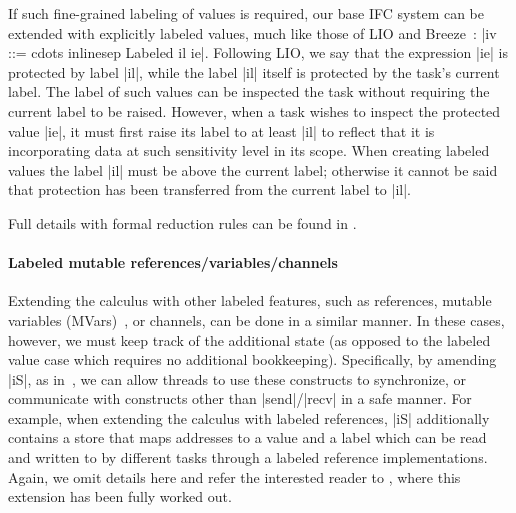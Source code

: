 If such fine-grained labeling of values is required, our base IFC
system can be extended with explicitly labeled
values, much like those of LIO and
Breeze~\cite{lio, Hritcu:2013:YIB:2497621.2498098}: |iv ::= cdots
inlinesep Labeled il ie|.
%
Following LIO, we say that the expression |ie| is protected by label |il|,
while the label |il| itself is protected by the task's current label.
%
%
The label of such values can be inspected the task without
requiring the current label to be raised.
%
However, when a task wishes to inspect the protected value |ie|, it
must first raise its label to at least |il| to reflect that it is
incorporating data at such sensitivity level in its scope.
%
When creating labeled values the label |il| must be above
the current label; otherwise it cannot be said that protection has
been transferred from the current label to |il|.
%

Full details with formal reduction rules can be found
in \appendixext{}.

\paragraph{Labeled mutable references/variables/channels}
%
Extending the calculus with other labeled features, such as
references, mutable variables (MVars)~\cite{CH96}, or channels,
can be done in a similar manner.
%
In these cases, however, we must keep track of the additional state
(as opposed to the labeled value case which requires no additional
bookkeeping).
%
%
Specifically, by amending |iS|, as in~\cite{lio,
stefan:addressing-covert}, we can allow threads to use these
constructs to synchronize, or communicate with constructs other than
|send|/|recv| in a safe manner.
%
For example, when extending the calculus with labeled references, |iS|
additionally contains a store that maps addresses to a value
and a label
which can be read and written to by different tasks through a labeled
reference implementations.
Again, we omit details here and refer the interested reader
to \appendixext{}, where this extension has been fully worked out.

